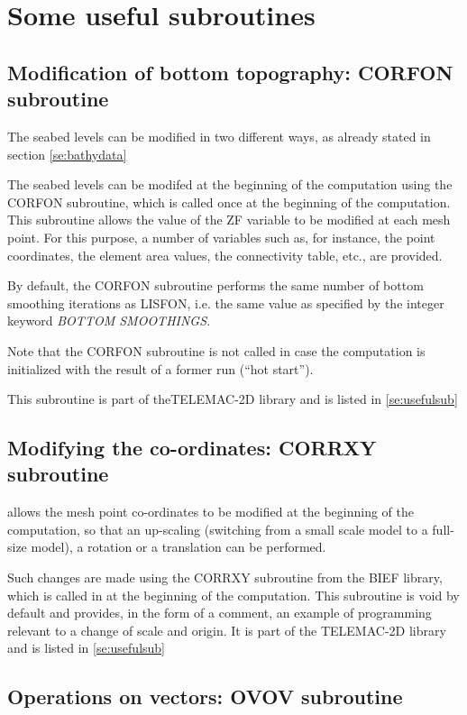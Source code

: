 \section{ Some useful subroutines}


\subsection{ Modification of bottom topography: CORFON subroutine}
\label{se:corfon}
 The seabed levels can be modified in two different ways, as already stated in section \ref{se:bathydata}

 The seabed levels can be modifed at the beginning of the computation using the CORFON subroutine, which is called once at the beginning of the computation. This subroutine allows the value of the ZF variable to be modified at each mesh point. For this purpose, a number of variables such as, for instance, the point coordinates, the element area values, the connectivity table, etc., are provided.

 By default, the CORFON subroutine performs the same number of bottom smoothing iterations as LISFON, i.e. the same value as specified by the integer keyword \textit{BOTTOM SMOOTHINGS.}

 Note that the CORFON subroutine is not called in case the computation is initialized with the result of a former \tomawac run (``hot start'').

 This subroutine is part of theTELEMAC-2D library and is listed in \ref{se:usefulsub}


\subsection{ Modifying the co-ordinates: CORRXY subroutine }

 \tomawac allows the mesh point co-ordinates to be modified at the beginning of the computation, so that an up-scaling (switching from a small scale model to a full-size model), a rotation or a translation can be performed.

 Such changes are made using the CORRXY subroutine from the BIEF library, which is called in at the beginning of the computation. This subroutine is void by default and provides, in the form of a comment, an example of programming relevant to a change of scale and origin. It is part of the TELEMAC-2D library and is listed in \ref{se:usefulsub}


\subsection{ Operations on vectors: OVOV subroutine }

